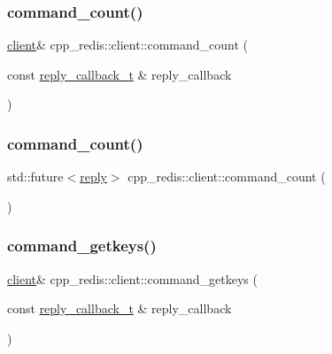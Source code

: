 \mbox{\label{classcpp__redis_1_1client_a639c7fd5c7899ba474e65513ee337bea}} 
\subsubsection{\texorpdfstring{command\+\_\+count()}{command\_count()}\hspace{0.1cm}{\footnotesize\ttfamily [1/2]}}
{\footnotesize\ttfamily \hyperlink{classcpp__redis_1_1client}{client}\& cpp\+\_\+redis\+::client\+::command\+\_\+count (\begin{DoxyParamCaption}\item[{const \hyperlink{classcpp__redis_1_1client_a061a1140d36d2eaeda82b09a0bb3f9f2}{reply\+\_\+callback\+\_\+t} \&}]{reply\+\_\+callback }\end{DoxyParamCaption})}

\mbox{\label{classcpp__redis_1_1client_af0cac37a62edbd7d699b379551f1ef9a}} 
\subsubsection{\texorpdfstring{command\+\_\+count()}{command\_count()}\hspace{0.1cm}{\footnotesize\ttfamily [2/2]}}
{\footnotesize\ttfamily std\+::future$<$\hyperlink{classcpp__redis_1_1reply}{reply}$>$ cpp\+\_\+redis\+::client\+::command\+\_\+count (\begin{DoxyParamCaption}{ }\end{DoxyParamCaption})}

\mbox{\label{classcpp__redis_1_1client_a3d23ff98ee82a404373d75b660720926}} 
\subsubsection{\texorpdfstring{command\+\_\+getkeys()}{command\_getkeys()}\hspace{0.1cm}{\footnotesize\ttfamily [1/2]}}
{\footnotesize\ttfamily \hyperlink{classcpp__redis_1_1client}{client}\& cpp\+\_\+redis\+::client\+::command\+\_\+getkeys (\begin{DoxyParamCaption}\item[{const \hyperlink{classcpp__redis_1_1client_a061a1140d36d2eaeda82b09a0bb3f9f2}{reply\+\_\+callback\+\_\+t} \&}]{reply\+\_\+callback }\end{DoxyParamCaption})}

